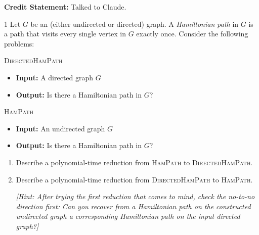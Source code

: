 \documentclass[12pt]{article}
\begin{document}


\textbf{Credit Statement:} Talked to Claude. 

\begin{problem}{1}
Let $G$ be an (either undirected or directed) graph. A \emph{Hamiltonian path} in $G$ is a path that visits every single vertex in $G$ exactly once. Consider the following problems:

\begin{tcolorbox}
\textsc{DirectedHamPath}
\begin{itemize}
    \item \textbf{Input:} A directed graph $G$
    \item \textbf{Output:} Is there a Hamiltonian path in $G$?
\end{itemize}
\end{tcolorbox}

\begin{tcolorbox}
\textsc{HamPath}
\begin{itemize}
    \item \textbf{Input:} An undirected graph $G$
    \item \textbf{Output:} Is there a Hamiltonian path in $G$?
\end{itemize}
\end{tcolorbox}

\begin{enumerate}
    \item Describe a polynomial-time reduction from \textsc{HamPath} to \textsc{DirectedHamPath}.

    \item Describe a polynomial-time reduction from \textsc{DirectedHamPath} to \textsc{HamPath}.

    \emph{[Hint: After trying the first reduction that comes to mind, check the no-to-no direction first: Can you recover from a Hamiltonian path on the constructed undirected graph a corresponding Hamiltonian path on the input directed graph?]}
\end{enumerate}
\end{problem}
\end{document}
